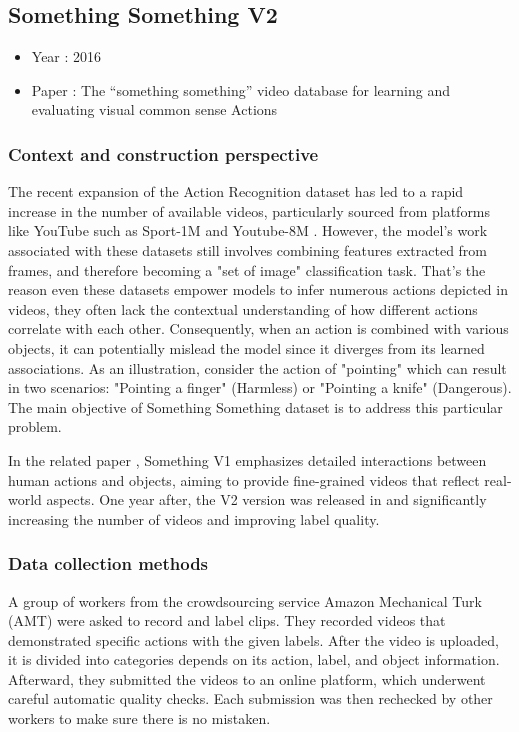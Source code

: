 \documentclass[10pt,onecolumn,letterpaper]{article}
\begin{document}
\subsection{Something Something V2}

\begin{itemize}
	\item Year : 2016
	\item Paper : The “something something” video database for learning and evaluating visual common sense
	Actions \cite{somethingsomething}
\end{itemize}

\subsubsection{\textbf{Context and construction perspective}}

The recent expansion of the Action Recognition dataset has led to a rapid increase in the number of available videos, particularly sourced from platforms like YouTube such as Sport-1M \cite{Sports1M} and Youtube-8M \cite{YouTube8M}. However, the model's work associated with these datasets still involves combining features extracted from frames, and therefore becoming a "set of image" classification task. That's the reason even these datasets empower models to infer numerous actions depicted in videos, they often lack the contextual understanding of how different actions correlate with each other. Consequently, when an action is combined with various objects, it can potentially mislead the model since it diverges from its learned associations. As an illustration, consider the action of "pointing" which can result in two scenarios: "Pointing a finger" (Harmless) or "Pointing a knife" (Dangerous). The main objective of Something Something dataset is to address this particular problem.

In the related paper \cite{somethingsomething}, Something V1 emphasizes detailed interactions between human actions and objects, aiming to provide fine-grained videos that reflect real-world aspects. One year after, the V2 version was released in \cite{Somethingv2} and significantly increasing the number of videos and improving label quality.
\subsubsection{Data collection methods}
A group of workers from the crowdsourcing service Amazon Mechanical Turk (AMT) were asked to record and label clips. They recorded videos that demonstrated specific actions with the given labels. After the video is uploaded, it is divided into categories depends on its action, label, and object information. Afterward, they submitted the videos to an online platform, which underwent careful automatic quality checks. Each submission was then rechecked by other workers to make sure there is no mistaken.
\end{document}
